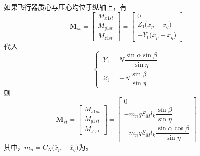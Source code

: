 如果飞行器质心与压心均位于纵轴上，有
\begin{equation}
	\bm{M}_{st} = 
	\begin{bmatrix}
		M_{x1st}\\
		M_{y1st}\\
		M_{z1st}
	\end{bmatrix}
	=
	\begin{bmatrix}
		0 \\
		Z_1\big(x_p - x_g\big) \\
		-Y_1 \big(x_p - x_g\big)
	\end{bmatrix}
\end{equation}
代入
\begin{equation*}
	\begin{cases}
		\, Y_1 = N\dfrac{\sin \alpha \sin \beta}{\sin \eta}\\[0.8em]
		\, Z_1 = - N \dfrac{\sin \beta}{\sin \eta}
	\end{cases}
\end{equation*}
则
\begin{equation}
	\bm{M}_{st} = 
	\begin{bmatrix}
		M_{x1st}\\
		M_{y1st}\\
		M_{z1st}
	\end{bmatrix}
	=
	\begin{bmatrix}
		0 \\
		- m_n q S_M l_k \dfrac{\sin \beta}{\sin \eta} \\[0.8em]
		- m_n q S_M l_k \dfrac{\sin \alpha \cos \beta}{\sin \eta}
	\end{bmatrix}
\end{equation}
其中，$m_n = C_N \big(\overline{x}_p - \overline{x}_g\big)$为。













